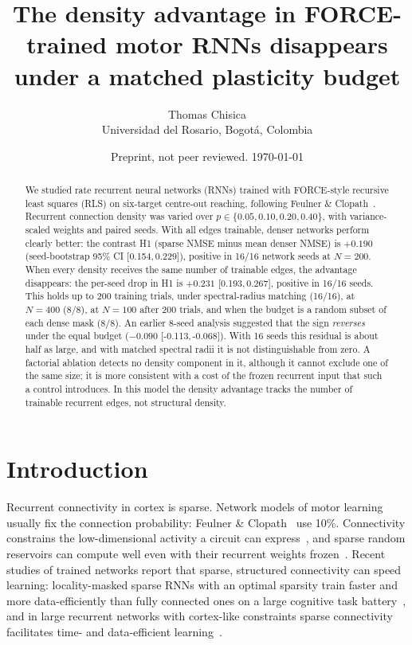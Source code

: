 \documentclass[11pt]{article}
\title{The density advantage in FORCE-trained motor RNNs disappears under a
matched plasticity budget}
\author{%
  Thomas Chisica\\
  \small Universidad del Rosario, Bogot\'a, Colombia
}
\date{Preprint, not peer reviewed. \today}
\newcommand{\ci}[2]{[#1,\,#2]}
\begin{document}
\maketitle

\begin{abstract}
We studied rate recurrent neural networks (RNNs) trained with FORCE-style
recursive least squares (RLS) on six-target centre-out reaching, following
Feulner \& Clopath~\cite{feulner2021neural}. Recurrent connection density was
varied over $p\in\{0.05,0.10,0.20,0.40\}$, with variance-scaled weights and
paired seeds. With all edges trainable, denser networks perform clearly better:
the contrast H1 (sparse NMSE minus mean denser NMSE) is $+0.190$ (seed-bootstrap
95\% CI \ci{0.154}{0.229}), positive in 16/16 network seeds at $N=200$. When
every density receives the same number of trainable edges, the advantage
disappears: the per-seed drop in H1 is $+0.231$ \ci{0.193}{0.267}, positive in
16/16 seeds. This holds up to 200 training trials, under spectral-radius
matching (16/16), at $N=400$ (8/8), at $N=100$ after 200 trials, and when the
budget is a random subset of each dense mask (8/8). An earlier 8-seed analysis
suggested that the sign \emph{reverses} under the equal budget
($-0.090$ \ci{-0.113}{-0.068}). With 16 seeds this residual is about half as
large, and with matched spectral radii it is not distinguishable from zero. A
factorial ablation detects no density component in it, although it cannot
exclude one of the same size; it is more consistent with a cost of the frozen
recurrent input that such a control introduces. In this model the density
advantage tracks the number of trainable recurrent edges, not structural
density.
\end{abstract}

\section{Introduction}

Recurrent connectivity in cortex is sparse. Network models of motor learning
usually fix the connection probability: Feulner \&
Clopath~\cite{feulner2021neural} use 10\%. Connectivity constrains the
low-dimensional activity a circuit can express~\cite{warnberg2019perturbing},
and sparse random reservoirs can compute well even with their recurrent
weights frozen~\cite{jaeger2004harnessing}. Recent studies of trained
networks report that sparse, structured connectivity can speed learning:
locality-masked sparse RNNs with an optimal sparsity train faster and more
data-efficiently than fully connected ones on a large cognitive task
battery~\cite{khona2023winning}, and in large recurrent networks with
cortex-like constraints sparse connectivity facilitates time- and
data-efficient learning~\cite{fruengel2025sparse}.
\end{document}

